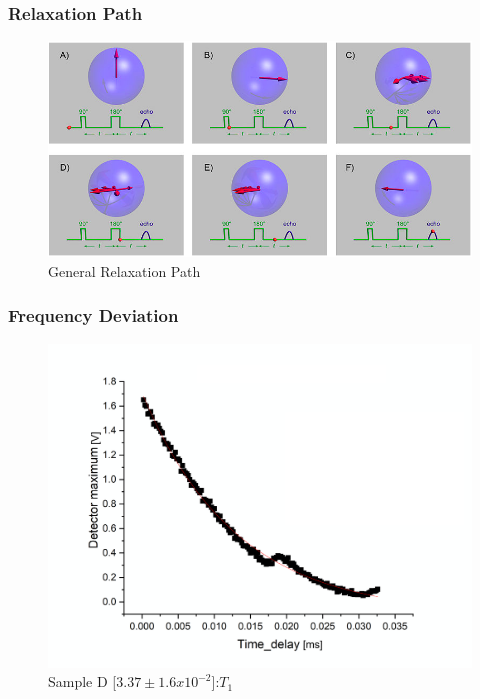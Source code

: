 \begin{frame}
    \frametitle{Relaxation Path}
    \begin{figure}[htbp!]
      \begin{center}
        \includegraphics[width=\linewidth]{./images/figures/theory/relax.png}
      \end{center}
            \caption{General Relaxation Path \cite{spin_echo}}
      \label{fig:relax}
    \end{figure}
  \end{frame}

\begin{frame}
    \frametitle{Frequency Deviation}
    \begin{figure}[htbp!]
        \begin{center}
            \includegraphics[scale=0.31]{./images/figures/theory/d-t1.png}
        \end{center}
                \caption{Sample D [$ 3.37 \pm 1.6 x 10^{-2}$]:$ T_1$}
        \label{fig:d_t1}
    \end{figure}
\end{frame}

